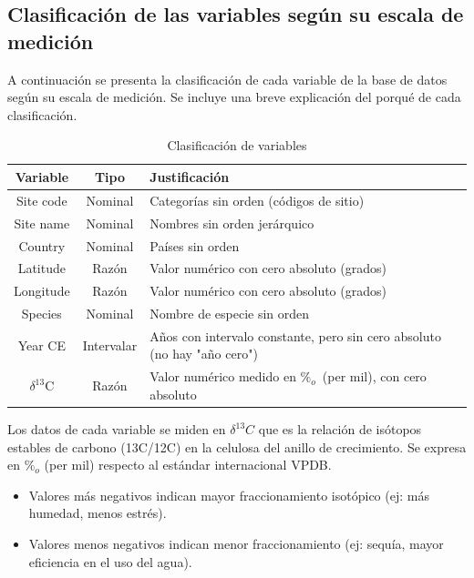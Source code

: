 \documentclass[a4paper,11pt]{article}
\begin{document}
\newpage

\subsection*{Clasificación de las variables según su escala de medición}

A continuación se presenta la clasificación de cada variable de la base de datos
según su escala de medición. Se incluye una breve explicación del porqué de cada
clasificación.

\begin{table}[ht]
    \centering
    \caption{Clasificación de variables}
    \label{tab:clasificacion_variables}
    \begin{tabular}{|c|c|l|}
        \hline
        \textbf{Variable} & \textbf{Tipo} & \textbf{Justificación} \\
        \hline
        Site code & Nominal & Categorías sin orden (códigos de sitio) \\
        Site name & Nominal & Nombres sin orden jerárquico \\
        Country & Nominal & Países sin orden \\
        Latitude & Razón & Valor numérico con cero absoluto (grados) \\
        Longitude & Razón & Valor numérico con cero absoluto (grados) \\
        Species & Nominal & Nombre de especie sin orden \\
        Year CE & Intervalar & Años con intervalo constante, pero sin cero
        absoluto (no hay "año cero") \\
        $\delta^{13}$C & Razón & Valor numérico medido en $\%_o$\
        (per mil), con cero absoluto\\
        \hline
    \end{tabular}
\end{table}

Los datos de cada variable se miden en $\delta^{13}C$ que es la relación de
isótopos estables de carbono (13C/12C) en la celulosa del anillo de crecimiento.
Se expresa en $\%_o$ (per mil) respecto al estándar internacional VPDB.
\begin{itemize}
	\item Valores más negativos indican mayor fraccionamiento isotópico (ej: más
    humedad, menos estrés).

	\item Valores menos negativos indican menor fraccionamiento (ej: sequía,
    mayor eficiencia en el uso del agua).
\end{itemize}
\end{document}
